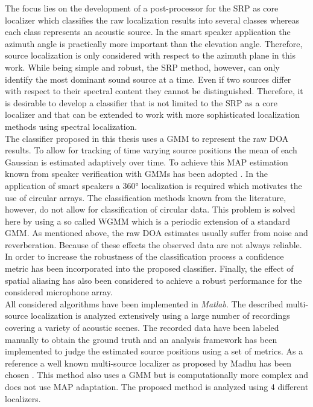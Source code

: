 The focus lies on the development of a post-processor for the \ac{SRP} as core localizer which classifies the raw localization results into several classes whereas each class represents an acoustic source. In the smart speaker application the azimuth angle is practically more important than the elevation angle. Therefore, source localization is only considered with respect to the azimuth plane in this work. While being simple and robust, the \ac{SRP} method, however, can only identify the most dominant sound source at a time. Even if two sources differ with respect to their spectral content they cannot be distinguished. Therefore, it is desirable to develop a classifier that is not limited to the \ac{SRP} as a core localizer and that can be extended to work with more sophisticated localization methods using spectral localization. \\

The classifier proposed in this thesis uses a \ac{GMM} to represent the raw \ac{DOA} results. To allow for tracking of time varying source positions the mean of each Gaussian is estimated adaptively over time. To achieve this \ac{MAP} estimation known from speaker verification with \acp{GMM} has been adopted \cite{279278}. In the application of smart speakers a $\ang{360}$ localization is required which motivates the use of circular arrays. The classification methods known from the literature, however, do not allow for classification of circular data. This problem is solved here by using a so called \ac{WGMM} which is a periodic extension of a standard \ac{GMM}. As mentioned above, the raw DOA estimates usually suffer from noise and reverberation. Because of these effects the observed data are not always reliable. In order to increase the robustness of the classification process a confidence metric has been incorporated into the proposed classifier. Finally, the effect of spatial aliasing has also been considered to achieve a robust performance for the considered microphone array.\\

All considered algorithms have been implemented in \emph{Matlab}. The described multi-source localization is analyzed extensively using a large number of recordings covering a variety of acoustic scenes. The recorded data have been labeled manually to obtain the ground truth and an analysis framework has been implemented to judge the estimated source positions using a set of metrics. As a reference a well known multi-source localizer as proposed by Madhu has been chosen \cite{madhu2008scalable}. This method also uses a \ac{GMM} but is computationally more complex and does not use \ac{MAP} adaptation. The proposed method is analyzed using 4 different localizers. \\

